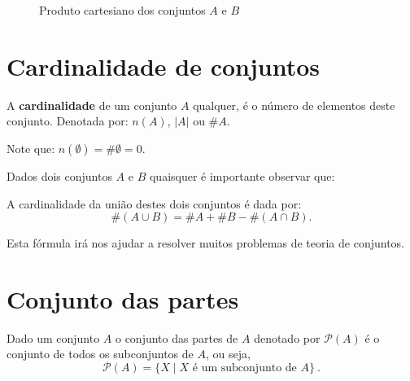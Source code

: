 \begin{exem}
  \begin{figure}[H]
 \centering
    \caption{Produto cartesiano dos conjuntos $A$ e $B$}
  \end{figure}

 \end{exem}

\section{Cardinalidade de conjuntos}

 A \textbf{cardinalidade} de um conjunto $A$ qualquer, é o número de elementos deste conjunto. Denotada por: $n(A)$, $|A|$ ou $\# A$.

 Note que: $n(\emptyset)= \# \emptyset= 0$.

 Dados dois conjuntos $A$ e $B$ quaisquer é importante observar que:
 \vskip0.3cm
 \colorbox{azul}{
 \begin{minipage}{0.9\linewidth}
 \begin{center}
 A cardinalidade da união destes dois conjuntos é dada por:
  \[\#(A \cup B)= \# A + \# B - \#(A \cap B) .\]
 \end{center}
 \end{minipage}}
 \vskip0.3cm

 Esta fórmula irá nos ajudar a resolver muitos problemas de teoria de conjuntos.

 \section{Conjunto das partes}

 Dado um conjunto $A$ o conjunto das partes de $A$ denotado por $\mathcal{P}(A)$ é o conjunto de todos os subconjuntos de $A$, ou seja,
 \[\mathcal{P}(A)= \{X \mid X \text{ é um subconjunto de } A\} \ .\]

